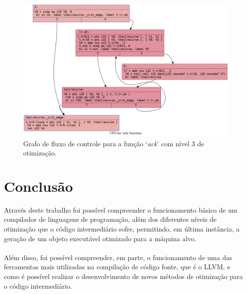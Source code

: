 \documentclass[12pt]{article}
\begin{document}
\begin{figure}
    \centering
    \includegraphics[width=0.5\linewidth]{recursive_.ack_O3.png}
    \caption{Grafo de fluxo de controle para a função ‘\textit{ack}’ com nível 3 de otimização.}
\end{figure}

\FloatBarrier

\section{Conclusão}

\paragraph{}Através deste trabalho foi possível compreender o funcionamento básico de um compilador de linguagens de programação, além dos diferentes níveis de otimização que o código intermediário sofre, permitindo, em última instância, a geração de um objeto executável otimizado para a máquina alvo.

\paragraph{}Além disso, foi possível compreender, em parte, o funcionamento de uma das ferramentas mais utilizadas na compilação de código fonte, que é o LLVM, e como é possível realizar o desenvolvimento de novos métodos de otimização para o código intermediário.



\nocite{otimizacao}
\end{document}
